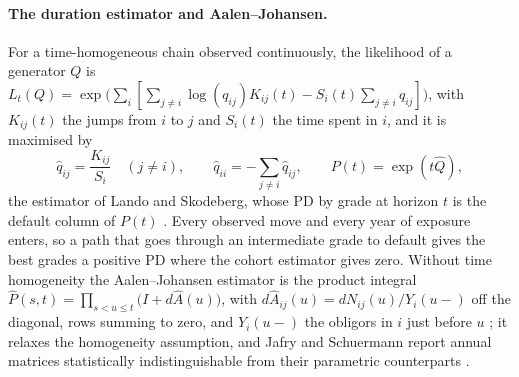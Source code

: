 \paragraph{The duration estimator and Aalen--Johansen.} For a time-homogeneous chain observed continuously, the likelihood of a generator $Q$ is $L_t(Q)=\exp\bigl(\sum_i[\sum_{j\ne i}\log(q_{ij})K_{ij}(t)-S_i(t)\sum_{j\ne i}q_{ij}]\bigr)$, with $K_{ij}(t)$ the jumps from $i$ to $j$ and $S_i(t)$ the time spent in $i$, and it is maximised by
\begin{equation}
\hat q_{ij}=\frac{K_{ij}}{S_i}\quad(j\ne i),\qquad \hat q_{ii}=-\sum_{j\ne i}\hat q_{ij},\qquad P(t)=\exp(t\hat Q),
\label{eq:ratings-duration}
\end{equation}
the estimator of Lando and Skodeberg, whose PD by grade at horizon $t$ is the default column of $P(t)$ \citep{ratings:landoskodeberg2002}. Every observed move and every year of exposure enters, so a path that goes through an intermediate grade to default gives the best grades a positive PD where the cohort estimator gives zero. Without time homogeneity the Aalen--Johansen estimator is the product integral $\hat P(s,t)=\prod_{s<u\le t}\bigl(I+d\hat A(u)\bigr)$, with $d\hat A_{ij}(u)=dN_{ij}(u)/Y_i(u-)$ off the diagonal, rows summing to zero, and $Y_i(u-)$ the obligors in $i$ just before $u$ \citep{ratings:aalen1978}; it relaxes the homogeneity assumption, and Jafry and Schuermann report annual matrices statistically indistinguishable from their parametric counterparts \citep{ratings:jafry2004,ratings:schuermann2004}.

